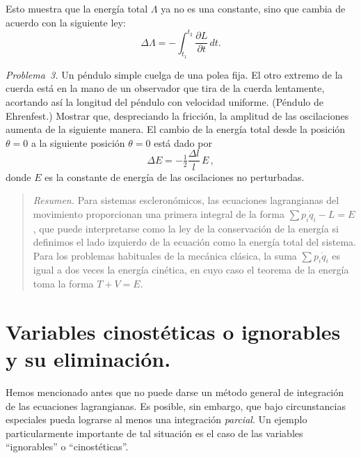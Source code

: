 \documentclass[12pt,a4paper]{book}
\begin{document}
Esto muestra que la energía total $\Lambda$ ya no es una constante, sino que cambia de acuerdo con la siguiente ley:
\begin{equation}
\Delta\Lambda = -\int_{t_1}^{t_2} \frac{\partial L}{\partial t}\,dt. \tag{53.24}
\end{equation}

\textit{Problema~3.} Un péndulo simple cuelga de una polea fija. El otro extremo de la cuerda está en la mano de un observador que tira de la cuerda lentamente, acortando así la longitud del péndulo con velocidad uniforme. (Péndulo de Ehrenfest.) Mostrar que, despreciando la fricción, la amplitud de las oscilaciones aumenta de la siguiente manera. El cambio de la energía total desde la posición $\theta = 0$ a la siguiente posición $\theta = 0$ está dado por
\[
\Delta E = -\tfrac{1}{2}\frac{\Delta l}{l}\,E\,,
\]
donde $E$ es la constante de energía de las oscilaciones no perturbadas.

\begin{quote}
\textit{Resumen.} Para sistemas escleronómicos, las ecuaciones lagrangianas del movimiento proporcionan una primera integral de la forma $\sum p_i \dot{q}_i - L = E$, que puede interpretarse como la ley de la conservación de la energía si definimos el lado izquierdo de la ecuación como la energía total del sistema. Para los problemas habituales de la mecánica clásica, la suma $\sum p_i \dot{q}_i$ es igual a dos veces la energía cinética, en cuyo caso el teorema de la energía toma la forma $T + V = E$.
\end{quote}


\section{Variables cinostéticas o ignorables y su eliminación.}

Hemos mencionado antes que no puede darse un método general de integración de las ecuaciones lagrangianas. Es posible, sin embargo, que bajo circunstancias especiales pueda lograrse al menos una integración \textit{parcial}. Un ejemplo particularmente importante de tal situación es el caso de las variables ``ignorables'' o ``cinostéticas''.
\end{document}
